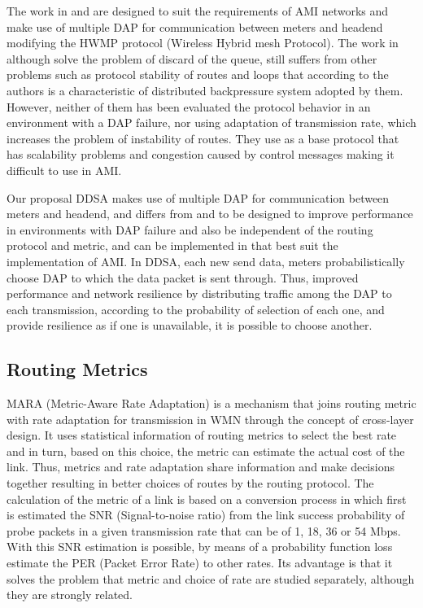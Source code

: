 \documentclass[conference]{IEEEtran}
\begin{document}
The work in \cite{6412861} and \cite{Gharavi2011} are designed to suit the requirements of AMI networks and make use of multiple DAP for communication between meters and headend modifying the HWMP protocol (Wireless Hybrid mesh Protocol). The work in \cite{Gharavi2011} although solve the problem of discard of the queue, still suffers from other problems such as protocol stability of routes and loops that according to the authors is a characteristic of distributed backpressure system adopted by them. However, neither of them has been evaluated the protocol behavior in an environment with a DAP failure, nor using adaptation of transmission rate, which increases the problem of instability of routes. They use as a base protocol that has scalability problems and congestion caused by control messages \cite{5473885} making it difficult to use in AMI.


Our proposal DDSA makes use of multiple DAP for communication between meters and headend, and differs from \cite{6412861} and \cite{Gharavi2011} to be designed to improve performance in environments with DAP failure and also be independent of the routing protocol and metric, and can be implemented in that best suit the implementation of AMI.
In DDSA, each new send data, meters probabilistically choose DAP to which the data packet is sent through. 
Thus, improved performance and network resilience by distributing traffic among the DAP to each transmission, according to the probability of selection of each one, and provide resilience as if one is unavailable, it is possible to choose another.


\subsection{Routing Metrics}
 

MARA (Metric-Aware Rate Adaptation) \cite{6051505} is a mechanism that joins routing metric with rate adaptation for transmission in WMN through the concept of cross-layer design.
It uses statistical information of routing metrics to select the best rate and in turn, based on this choice, the metric can estimate the actual cost of the link.
Thus, metrics and rate adaptation share information and make decisions together resulting in better choices of routes by the routing protocol.
The calculation of the metric of a link is based on a conversion process in which first is estimated the SNR (Signal-to-noise ratio) from the link success probability of probe packets in a given transmission rate that can be of 1, 18, 36 or 54 Mbps.
With this SNR estimation is possible, by means of a probability function loss estimate the PER (Packet Error Rate) to other rates. Its advantage is that it solves the problem that metric and choice of rate are studied separately, although they are strongly related.
\end{document}
